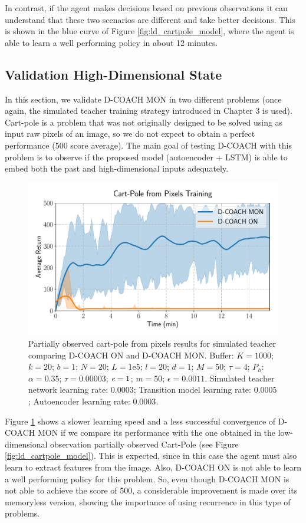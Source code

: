 In contrast, if the agent makes decisions based on previous observations it can understand that these two scenarios are different and take better decisions. This is shown in the blue curve of Figure \ref{fig:ld_cartpole_model}, where the agent is able to learn a well performing policy in about 12 minutes. 

\subsection{Validation High-Dimensional State}
In this section, we validate D-COACH MON in two different problems (once again, the simulated teacher training strategy introduced in Chapter 3 is used). Cart-pole is a problem that was not originally designed to be solved using as input raw pixels of an image, so we do not expect to obtain a perfect performance (500 score average). The main goal of testing D-COACH with this problem is to observe if the proposed model (autoencoder + LSTM) is able to embed both the past and high-dimensional inputs adequately.

\begin{figure}[h]
    \centering
    \includegraphics[width=0.7\linewidth]{imagenes/cap3/cartpole_HD_model.pdf}
    \vspace{-0.2cm}
    \caption[Partially observed Cart-Pole from pixels results for simulated teacher comparing D-COACH ON and D-COACH MON.]{Partially observed cart-pole from pixels results for simulated teacher comparing D-COACH ON and D-COACH MON.  Buffer: $K = 1000$; $k=20$; $b = 1$; $N = 20$; $L=1\mathrm{e}5$; $l=20$; $d=1$; $M=50$; $\tau=4$; $P_{h}$: $\alpha = 0.35$; $\tau = 0.00003$; $\emph{e}=1$; $m=50$; $\epsilon=0.0011$. Simulated teacher network learning rate: $0.0003$; Transition model learning rate: $0.0005$; Autoencoder learning rate: $0.0003$.}
    \label{fig:cp_hd}
\end{figure}

Figure \ref{fig:cp_hd} shows a slower learning speed and a less successful convergence of D-COACH MON if we compare its performance with the one obtained in the low-dimensional observation partially observed Cart-Pole (see Figure \ref{fig:ld_cartpole_model}). This is expected, since in this case the agent must also learn to extract features from the image. Also, D-COACH ON is not able to learn a well performing policy for this problem. So, even though D-COACH MON is not able to achieve the score of 500, a considerable improvement is made over its memoryless version, showing the importance of using recurrence in this type of problems.

